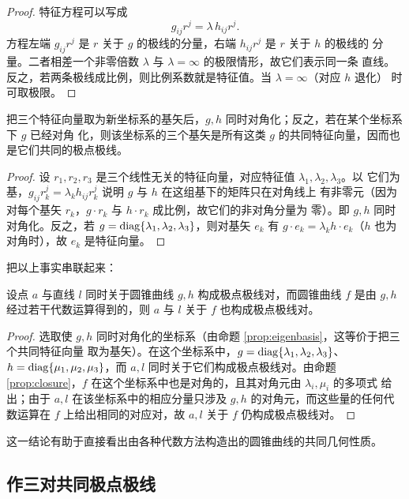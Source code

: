 \begin{proof}
特征方程可以写成
\[
g_{ij}r^j=\lambda\,h_{ij}r^j .
\]
方程左端 $g_{ij}r^j$ 是 $r$ 关于 $g$ 的极线的分量，右端 $h_{ij}r^j$ 是 $r$ 关于 $h$ 的极线的
分量。二者相差一个非零倍数 $\lambda$ 与 $\lambda=\infty$ 的极限情形，故它们表示同一条
直线。反之，若两条极线成比例，则比例系数就是特征值。当 $\lambda=\infty$（对应 $h$ 退化）
时可取极限。
\end{proof}

\begin{proposition}
\label{prop:eigenbasis}
把三个特征向量取为新坐标系的基矢后，$g,h$ 同时对角化；反之，若在某个坐标系下 $g$ 已经对角
化，则该坐标系的三个基矢是所有这类 $g$ 的共同特征向量，因而也是它们共同的极点极线。
\end{proposition}

\begin{proof}
设 $r_1,r_2,r_3$ 是三个线性无关的特征向量，对应特征值 $\lambda_1,\lambda_2,\lambda_3$。以
它们为基，$g_{ij}r_k^j=\lambda_k h_{ij}r_k^j$ 说明 $g$ 与 $h$ 在这组基下的矩阵只在对角线上
有非零元（因为对每个基矢 $r_k$，$g\cdot r_k$ 与 $h\cdot r_k$ 成比例，故它们的非对角分量为
零）。即 $g,h$ 同时对角化。反之，若 $g=\operatorname{diag}\{\lambda_1,\lambda_2,\lambda_3\}$，则对基矢
$e_k$ 有 $g\cdot e_k=\lambda_k h\cdot e_k$（$h$ 也为对角时），故 $e_k$ 是特征向量。
\end{proof}

把以上事实串联起来：

\begin{theorem}
\label{thm:common-polar}
设点 $a$ 与直线 $l$ 同时关于圆锥曲线 $g,h$ 构成极点极线对，而圆锥曲线 $f$ 是由 $g,h$
经过若干代数运算得到的，则 $a$ 与 $l$ 关于 $f$ 也构成极点极线对。
\end{theorem}

\begin{proof}
选取使 $g,h$ 同时对角化的坐标系（由命题 \ref{prop:eigenbasis}，这等价于把三个共同特征向量
取为基矢）。在这个坐标系中，$g=\operatorname{diag}\{\lambda_1,\lambda_2,\lambda_3\}$、
$h=\operatorname{diag}\{\mu_1,\mu_2,\mu_3\}$，而 $a,l$ 同时关于它们构成极点极线对。由命题
\ref{prop:closure}，$f$ 在这个坐标系中也是对角的，且其对角元由 $\lambda_i,\mu_i$ 的多项式
给出；由于 $a,l$ 在该坐标系中的相应分量只涉及 $g,h$ 的对角元，而这些量的任何代数运算在
$f$ 上给出相同的对应对，故 $a,l$ 关于 $f$ 仍构成极点极线对。
\end{proof}

这一结论有助于直接看出由各种代数方法构造出的圆锥曲线的共同几何性质。

\subsection{作三对共同极点极线}

